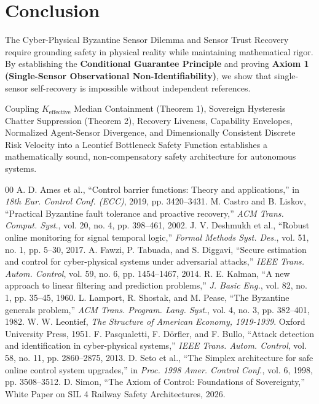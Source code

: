 \documentclass[conference]{IEEEtran}
\begin{document}
\section{Conclusion}

The Cyber-Physical Byzantine Sensor Dilemma and Sensor Trust Recovery require grounding safety in physical reality while maintaining mathematical rigor. By establishing the \textbf{Conditional Guarantee Principle} and proving \textbf{Axiom 1 (Single-Sensor Observational Non-Identifiability)}, we show that single-sensor self-recovery is impossible without independent references.

Coupling $K_{\text{effective}}$ Median Containment (Theorem 1), Sovereign Hysteresis Chatter Suppression (Theorem 2), Recovery Liveness, Capability Envelopes, Normalized Agent-Sensor Divergence, and Dimensionally Consistent Discrete Risk Velocity into a Leontief Bottleneck Safety Function establishes a mathematically sound, non-compensatory safety architecture for autonomous systems.

\begin{thebibliography}{00}
 A. D. Ames et al., ``Control barrier functions: Theory and applications,'' in \emph{18th Eur. Control Conf. (ECC)}, 2019, pp. 3420--3431.
 M. Castro and B. Liskov, ``Practical Byzantine fault tolerance and proactive recovery,'' \emph{ACM Trans. Comput. Syst.}, vol. 20, no. 4, pp. 398--461, 2002.
 J. V. Deshmukh et al., ``Robust online monitoring for signal temporal logic,'' \emph{Formal Methods Syst. Des.}, vol. 51, no. 1, pp. 5--30, 2017.
 A. Fawzi, P. Tabuada, and S. Diggavi, ``Secure estimation and control for cyber-physical systems under adversarial attacks,'' \emph{IEEE Trans. Autom. Control}, vol. 59, no. 6, pp. 1454--1467, 2014.
 R. E. Kalman, ``A new approach to linear filtering and prediction problems,'' \emph{J. Basic Eng.}, vol. 82, no. 1, pp. 35--45, 1960.
 L. Lamport, R. Shostak, and M. Pease, ``The Byzantine generals problem,'' \emph{ACM Trans. Program. Lang. Syst.}, vol. 4, no. 3, pp. 382--401, 1982.
 W. W. Leontief, \emph{The Structure of American Economy, 1919-1939}. Oxford University Press, 1951.
 F. Pasqualetti, F. Dörfler, and F. Bullo, ``Attack detection and identification in cyber-physical systems,'' \emph{IEEE Trans. Autom. Control}, vol. 58, no. 11, pp. 2860--2875, 2013.
 D. Seto et al., ``The Simplex architecture for safe online control system upgrades,'' in \emph{Proc. 1998 Amer. Control Conf.}, vol. 6, 1998, pp. 3508--3512.
 D. Simon, ``The Axiom of Control: Foundations of Sovereignty,'' White Paper on SIL 4 Railway Safety Architectures, 2026.
\end{thebibliography}
\end{document}
